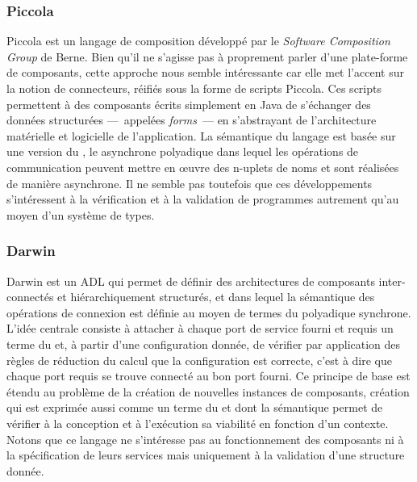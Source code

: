 \subsubsection{Piccola}
\textsf{Piccola} est un langage de composition d\'evelopp\'e par le
\emph{Software Composition Group} de
Berne\cite{piccola,formallangcomp,compsoftres}. Bien qu'il ne
s'agisse pas \`a proprement parler d'une plate-forme de composants,
cette approche nous semble int\'eressante car elle met l'accent sur la
notion de connecteurs, r\'eifi\'es sous la forme de scripts
\textsf{Piccola}. Ces scripts permettent \`a des composants \'ecrits
simplement en \textsf{Java} de s'\'echanger des donn\'ees structur\'ees
---~appel\'ees \emph{forms}~--- en s'abstrayant de l'architecture
mat\'erielle et logicielle de l'application. La s\'emantique du
langage est bas\'ee sur une version du \pc, le \pc asynchrone
polyadique dans lequel les op\'erations de communication peuvent
mettre en \oe uvre des n-uplets de noms et sont r\'ealis\'ees  de
mani\`ere asynchrone. Il ne semble pas
toutefois que ces d\'eveloppements s'int\'eressent \`a la v\'erification et \`a la validation de
programmes autrement qu'au moyen d'un syst\`eme de types\cite{regtypes}. 

\subsubsection{Darwin}

\textsf{Darwin}\cite{darwin} est  un \textsf{ADL} qui
permet de d\'efinir des architectures de composants inter-connect\'es
et hi\'erarchiquement structur\'es, et dans lequel la s\'emantique
des op\'erations de connexion est d\'efinie au moyen de termes du
\pc polyadique synchrone. L'id\'ee centrale consiste \`a attacher
\`a chaque port de service fourni et requis un terme du \pc et, \`a
partir d'une configuration donn\'ee, de v\'erifier par application
des r\`egles de r\'eduction du calcul que la configuration est
correcte, c'est \`a dire que chaque port requis se trouve connect\'e
au bon port fourni. Ce principe de base est \'etendu au probl\`eme
de la cr\'eation de nouvelles instances de composants, cr\'eation
qui est exprim\'ee aussi comme un terme du \pc et dont la
s\'emantique permet de v\'erifier \`a la
conception  et \`a l'ex\'ecution sa viabilit\'e en fonction d'un contexte. Notons que ce
langage ne s'int\'eresse pas au fonctionnement des
composants ni \`a la sp\'ecification de leurs services mais
uniquement \`a la validation d'une structure donn\'ee. 

